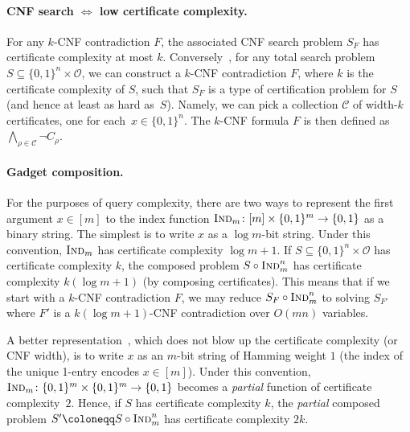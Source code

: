 \documentclass{toc}
\newcommand{\Ind}{\textsc{Ind}}
\newcommand{\calC}{\mathcal{C}}
\newcommand{\calO}{\mathcal{O}}
\newcommand{\bit}{\{0,1\}}
\begin{document}
\paragraph{CNF search $\Leftrightarrow$ low certificate complexity.}
For any $k$-CNF contradiction $F$, the associated CNF search problem $S_F$ has certificate complexity at most $k$. Conversely~\cite{lovasz95search}, for any total search problem $S\subseteq\{0,1\}^n\times\calO$, we can construct a $k$-CNF contradiction $F$, where $k$ is the certificate complexity of $S$, such that $S_F$ is a type of certification problem for $S$ (and hence at least as hard as~$S$). Namely, we can pick a collection $\calC$ of width-$k$ certificates, one for each~$x\in\{0,1\}^n$. The $k$-CNF formula $F$ is then defined as $\bigwedge_{\rho\in\calC} \neg C_\rho$.

\paragraph{Gadget composition.}
For the purposes of query complexity, there are two ways to represent the first argument $x\in[m]$ to the index function $\Ind_m\colon[m]\times\{0,1\}^m\to\bit$ as a binary string. The simplest is to write $x$ as a $\log m$-bit string. Under this convention, $\Ind_m$ has certificate complexity $\log m+1$. If $S\subseteq\{0,1\}^n\times\calO$ has certificate complexity $k$, the composed problem $S\circ \Ind_m^n$ has certificate complexity $k(\log m+1)$ (by composing certificates). This means that if we start with a $k$-CNF contradiction $F$, we may reduce $S_F\circ\Ind_m^n$ to solving $S_{F'}$ where $F'$ is a $k(\log m +1)$-CNF contradiction over $O(mn)$ variables.

A better representation~\cite{beame10hardness,rezende16limited}, which does not blow up the certificate complexity (or CNF width), is to write $x$ as an $m$-bit string of Hamming weight $1$ (the index of the unique 1-entry encodes $x\in[m]$). Under this convention, $\Ind_m\colon\{0,1\}^m\times\{0,1\}^m\to\{0,1\}$ becomes a \emph{partial} function of certificate complexity~$2$. Hence, if $S$ has certificate complexity $k$, the \emph{partial} composed problem $S'\coloneqq S\circ\Ind_m^n$ has certificate complexity $2k$.
\end{document}

